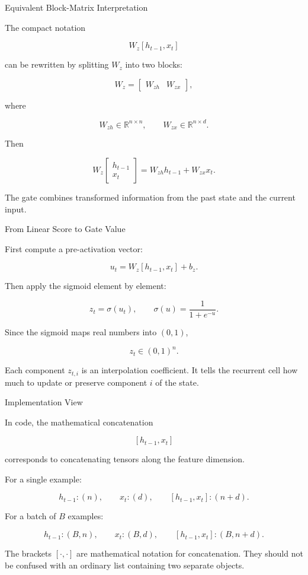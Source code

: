 \documentclass[aspectratio=169]{beamer}
\begin{document}
%
%
\begin{frame}{Equivalent Block-Matrix Interpretation}
\small

The compact notation

\[
  W_z [h_{t-1}, x_t]
\]

can be rewritten by splitting $W_z$ into two blocks:

\[
  W_z = \begin{bmatrix} W_{zh} & W_{zx} \end{bmatrix},
\]

where

\[
  W_{zh} \in \mathbb{R}^{n \times n},
  \qquad
  W_{zx} \in \mathbb{R}^{n \times d}.
\]

Then

\[
  W_z
  \begin{bmatrix}
  h_{t-1} \\
  x_t
  \end{bmatrix}
  =
  W_{zh} h_{t-1} + W_{zx} x_t.
\]

The gate combines transformed information from the past state and the current input.

\end{frame}
%
%
\begin{frame}{From Linear Score to Gate Value}

First compute a pre-activation vector:

\[
  u_t = W_z [h_{t-1}, x_t] + b_z.
\]

Then apply the sigmoid element by element:

\[
  z_t = \sigma(u_t),
  \qquad
  \sigma(u) = \frac{1}{1+e^{-u}}.
\]

Since the sigmoid maps real numbers into $(0,1)$,

\[
  z_t \in (0,1)^n.
\]

Each component $z_{t,i}$ is an interpolation coefficient.  
It tells the recurrent cell how much to update or preserve component $i$ of the state.

\end{frame}
%
%
\begin{frame}{Implementation View}

In code, the mathematical concatenation

\[
  [h_{t-1},x_t]
\]

corresponds to concatenating tensors along the feature dimension.

\vspace{0.25cm}

For a single example:

\[
  h_{t-1}: (n),
  \qquad
  x_t: (d),
  \qquad
  [h_{t-1},x_t]: (n+d).
\]

For a batch of $B$ examples:

\[
  h_{t-1}: (B,n),
  \qquad
  x_t: (B,d),
  \qquad
  [h_{t-1},x_t]: (B,n+d).
\]

The brackets $[\cdot,\cdot]$ are mathematical notation for concatenation. They should not be confused with an ordinary list containing two separate objects.

\end{frame}
%
%
\end{document}
